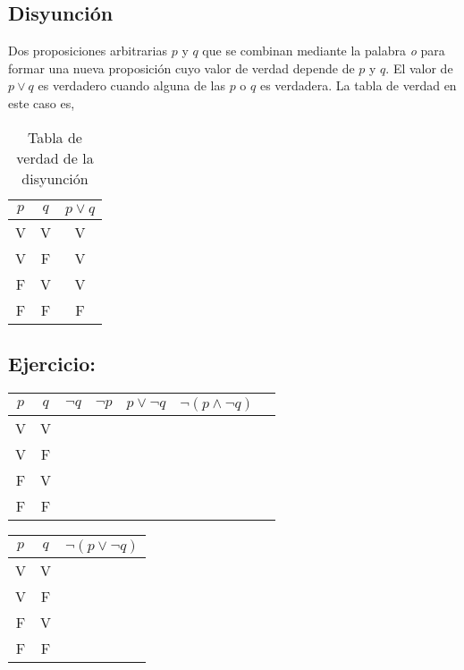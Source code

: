\documentclass{assignment}
\begin{document}
\subsection*{Disyunción}
Dos proposiciones arbitrarias $p$ y $q$ que se combinan mediante la palabra \emph{o} para formar una nueva proposición cuyo valor de verdad depende de $p$ y $q.$ El valor de $p \vee q$ es verdadero cuando alguna de las $p$ o $q$ es verdadera. La tabla de verdad en este caso es,

\begin{table}[h]
    \centering
    \begin{tabular}{|c|c|c|}
    \hline
    $p$  & $q$ & $p \vee q$   \\
    \hline
    V  & V & V   \\
    \hline
    V  & F & V   \\
    \hline
    F  & V & V   \\
    \hline
    F  & F & F   \\
    \hline
    \end{tabular}
    \caption{Tabla de verdad de la disyunción}
\end{table}

\subsection*{Ejercicio:}

\begin{table}[h]
    \centering
    \begin{tabular}{ |c|c|c|c|c|c|c| }
    \hline
    $p$  & $q$ & $\neg q$ & $\neg p$ & $p \vee \neg q$ &  $\neg (p \wedge \neg q)$ \\
    \hline
    V & V & & & & \\
    \hline
    V  & F & & & &\\
    \hline
    F  & V & & & &\\
    \hline
    F  & F & & & &\\
    \hline
    \end{tabular}

    \centering
    \begin{tabular}{ |c|c|c| }
    \hline
    $p$  & $q$ &  $\neg (p \vee \neg q)$ \\
    \hline
    V & V &   \\
    \hline
    V  & F &  \\
    \hline
    F  & V &  \\
    \hline
    F  & F &  \\
    \hline
    \end{tabular}
\end{table}
\end{document}
